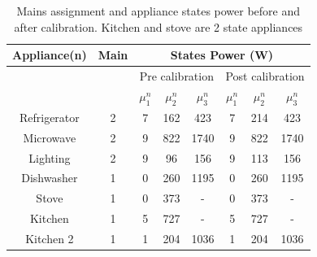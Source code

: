 \documentclass[conference]{IEEEtran}
\begin{document}
%   
%
\begin{table}
\caption{Mains assignment and appliance states power before and after calibration. Kitchen and stove are 2 state appliances}
\vspace{-8pt}
\label{tab:calibration_factors}
\centering
\begin{minipage}{\columnwidth}

\centering

\begin{tabular}{|c|c|c|c|c|c|c|c|}
\hline
Appliance(n) & Main & \multicolumn{6}{|c|}{States Power (W)}\\
\hline
&&\multicolumn{3}{|c|}{Pre calibration}&\multicolumn{3}{|c|}{Post calibration}\\
\hline
             &  &$\mu^n_1$&$\mu^n_2$&$\mu^n_3$&$\mu^n_1$&$\mu^n_2$&$\mu^n_3$\\[0.1cm]
\hline
Refrigerator & 2& 7&162&423 & 7&214&423\\
Microwave &2& 9&822&1740& 9&822&1740\\
Lighting & 2& 9&96&156&9&113&156\\
Dishwasher & 1& 0&260& 1195 & 0&260& 1195\\
Stove& 1 & 0&373&-& 0&373&-\\
Kitchen & 1& 5&727&-&5&727&-\\
Kitchen 2&1 & 1&204&1036&1&204&1036 \\
%
%
\hline
%
\end{tabular}
\end{minipage}
\vspace{-5mm}
\end{table}
\vspace{-3mm}
\end{document}
